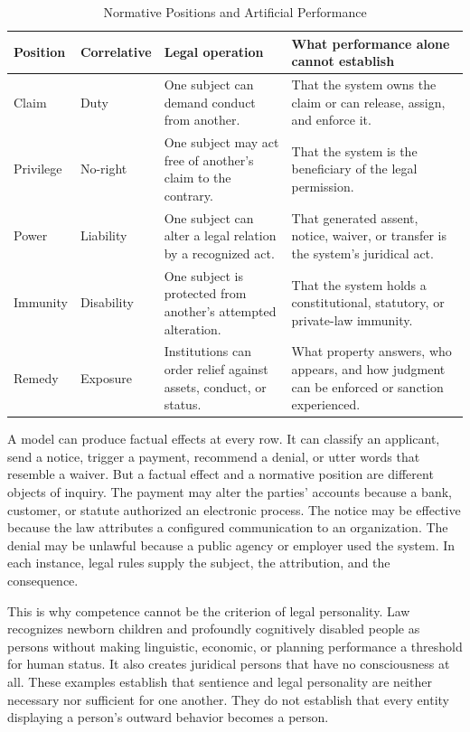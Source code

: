 \begin{table}[htbp]
\centering
\caption{Normative Positions and Artificial Performance}
\label{tab:hohfeld}
\small
\begin{tabularx}{\textwidth}{>{\raggedright\arraybackslash}p{} >{\raggedright\arraybackslash}p{} >{\raggedright\arraybackslash}p{} X}
\toprule
Position & Correlative & Legal operation & What performance alone cannot establish \\
\midrule
Claim & Duty & One subject can demand conduct from another. & That the system owns the claim or can release, assign, and enforce it. \\
Privilege & No-right & One subject may act free of another's claim to the contrary. & That the system is the beneficiary of the legal permission. \\
Power & Liability & One subject can alter a legal relation by a recognized act. & That generated assent, notice, waiver, or transfer is the system's juridical act. \\
Immunity & Disability & One subject is protected from another's attempted alteration. & That the system holds a constitutional, statutory, or private-law immunity. \\
Remedy & Exposure & Institutions can order relief against assets, conduct, or status. & What property answers, who appears, and how judgment can be enforced or sanction experienced. \\
\bottomrule
\end{tabularx}
\end{table}

A model can produce factual effects at every row. It can classify an applicant, send a notice, trigger a payment, recommend a denial, or utter words that resemble a waiver. But a factual effect and a normative position are different objects of inquiry. The payment may alter the parties' accounts because a bank, customer, or statute authorized an electronic process. The notice may be effective because the law attributes a configured communication to an organization. The denial may be unlawful because a public agency or employer used the system. In each instance, legal rules supply the subject, the attribution, and the consequence.

This is why competence cannot be the criterion of legal personality. Law recognizes newborn children and profoundly cognitively disabled people as persons without making linguistic, economic, or planning performance a threshold for human status. It also creates juridical persons that have no consciousness at all. These examples establish that sentience and legal personality are neither necessary nor sufficient for one another. They do not establish that every entity displaying a person's outward behavior becomes a person.

